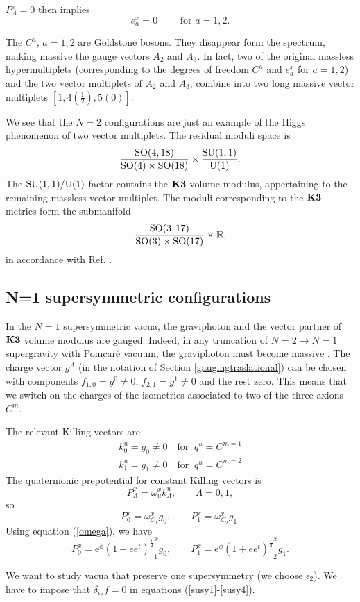 \documentclass[a4paper,12pt]{article}
\begin{document}
$P^x_\Lambda=0$ then implies
$$e^x_a =0\qquad \mbox{ for } a=1,2.$$

The $C^a$, $a=1,2$ are Goldstone bosons. They disappear form the
spectrum, making massive the gauge vectors $A_2$ and $A_3$. In
fact,  two of the original massless hypermultiplets (corresponding
to the degrees of freedom $C^a$ and $e_a^x$ for $a=1,2$) and the
two  vector multiplets of $A_2$ and $A_3$, combine into two long
massive vector multiplets $[1,4(\frac 1 2), 5(0)]$.

We see that the $N=2$ configurations are just an example of the
Higgs phenomenon of two vector multiplets. The residual moduli
space is
$$\frac{\mathrm{SO}(4,18)}{\mathrm{SO}(4)\times \mathrm{SO}(18)}\times
\frac{\mathrm{SU}(1,1)}{\mathrm{U}(1)}.$$ The ${\mathrm{SU}(1,1)}/{\mathrm{U}(1)}$ factor
contains the $\mathbf{K3}$ volume modulus, appertaining to  the remaining
massless vector multiplet. The moduli corresponding to the $\mathbf{K3}$
metrics form the submanifold
$$\frac{\mathrm{SO}(3,17)}{\mathrm{SO}(3)\times \mathrm{SO}(17)}\times \mathbb{R},$$
in accordance with Ref. \cite{tt}.

\subsection{N=1 supersymmetric configurations}

In the $N=1$ supersymmetric vacua, the  graviphoton and the vector
partner of $\mathbf{K3}$ volume modulus are gauged. Indeed, in  any
truncation of $N=2\rightarrow N=1$ supergravity with Poincar\'e
vacuum, the graviphoton must become massive \cite{adf}. The charge
vector $g^\Lambda$ (in  the notation of Section
\ref{gaugingtraslational}) can be chosen with components
$f_{1,0}=g^0\neq 0$, $f_{2,1}=g^1\neq 0$ and the rest zero. This
means that  we switch on the charges of the isometries associated
to two of the three axions $C^m$.

The relevant Killing vectors are \begin{eqnarray*} k_0^u=g_0\neq 0
\quad\mathrm{for}\;\; q^u=C^{m=1}\\
k_1^u=g_1\neq 0 \quad\mathrm{for}\;\; q^u=C^{m=2}
\end{eqnarray*}
The quaternionic prepotential for constant  Killing vectors is
$$P^x_{\Lambda}=\omega_u^xk^u_\Lambda, \qquad \Lambda=0,1,$$
so
$$P^x_0=\omega^x_{C_1}g_0, \qquad P^x_1=\omega^x_{C_2}g_1.$$
Using equation (\ref{omega}), we have
$$P_0^x=\mathrm{e}^\phi{(1+ee^t)^{\frac 1 2}}_{1}^xg_0, \qquad
P_1^x=\mathrm{e}^\phi{ (1+ee^t)^{\frac 1 2}}^x_{2}g_1.$$


We want to study vacua that preserve one supersymmetry (we choose
$\epsilon_2$). We have to impose that $\delta_{\epsilon_2}f=0$ in
equations (\ref{susy1}-\ref{susy4}).
\end{document}
